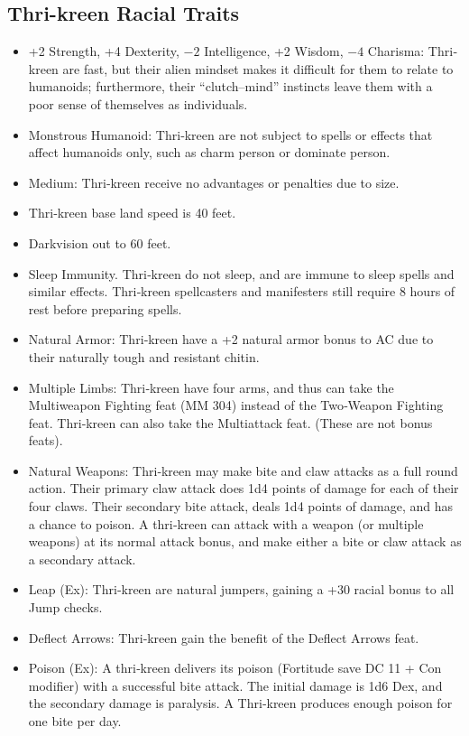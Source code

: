 \documentclass[10pt,a4paper,twocolumn]{d20}
\begin{document}
{\subsection{Thri-kreen Racial Traits}
\begin{itemize}
    \item +2 Strength, +4 Dexterity, $-2$ Intelligence, +2 Wisdom, $-4$ Charisma: Thri‐kreen are fast, but their alien mindset makes it difficult for them to relate to humanoids; furthermore, their ``clutch–mind'' instincts leave them with a poor sense of themselves as individuals.
    \item Monstrous Humanoid: Thri‐kreen are not subject to spells or effects that affect humanoids only, such as charm person or dominate person.
    \item Medium: Thri‐kreen receive no advantages or penalties due to size.
    \item Thri‐kreen base land speed is 40 feet.
    \item Darkvision out to 60 feet.
    \item Sleep Immunity. Thri‐kreen do not sleep, and are immune to sleep spells and similar effects. Thri‐kreen spellcasters and manifesters still require 8 hours of rest before preparing spells.
    \item Natural Armor: Thri‐kreen have a +2 natural armor bonus to AC due to their naturally tough and resistant chitin.
    \item Multiple Limbs: Thri‐kreen have four arms, and thus can take the Multiweapon Fighting feat (MM 304) instead of the Two‐Weapon Fighting feat. Thri‐kreen can also take the Multiattack feat. (These are not bonus feats).
    \item Natural Weapons: Thri‐kreen may make bite and claw attacks as a full round action. Their primary claw attack does 1d4 points of damage for each of their four claws. Their secondary bite attack, deals 1d4 points of damage, and has a chance to poison. A thri‐kreen can attack with a weapon (or multiple weapons) at its normal attack bonus, and make either a bite or claw attack as a secondary attack.
    \item Leap (Ex): Thri‐kreen are natural jumpers, gaining a +30 racial bonus to all Jump checks.
    \item Deflect Arrows: Thri‐kreen gain the benefit of the Deflect Arrows feat.
    \item Poison (Ex): A thri‐kreen delivers its poison (Fortitude save DC 11 + Con modifier) with a successful bite attack. The initial damage is 1d6 Dex, and the secondary damage is paralysis. A Thri‐kreen produces enough poison for one bite per day.

\end{itemize}}
\end{document}

